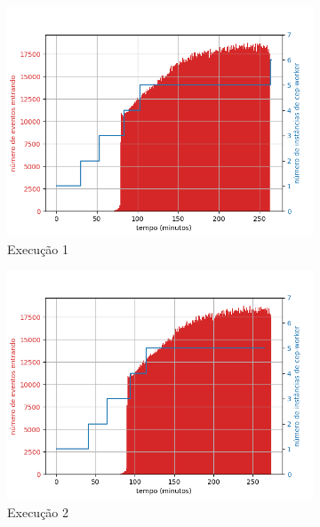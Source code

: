 \begin{figure}[h!]
\begin{subfigure}{.5\textwidth}
  \centering
  \includegraphics[width=\linewidth]{figuras/graphics/carga_e_workers_total6-dez-is.png}  
  \caption{Execução 1}
  \label{fig:cewt-6-dez-is}
\end{subfigure}
\begin{subfigure}{.5\textwidth}
  \centering
  \includegraphics[width=\linewidth]{figuras/graphics/carga_e_workers_total7-dez-is.png}  
  \caption{Execução 2}
  \label{fig:cewt-7-dez-is}
\end{subfigure}
\begin{subfigure}{.5\textwidth}

\end{subfigure}
\end{figure}
